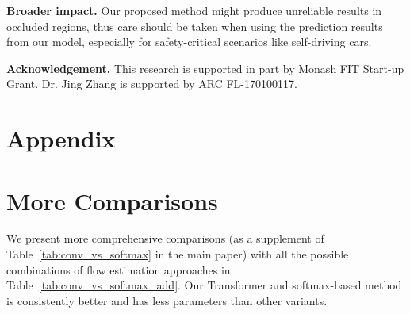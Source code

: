 \documentclass[10pt,twocolumn,letterpaper]{article}
\begin{document}
\textbf{Broader impact.} Our proposed method might produce unreliable results in occluded regions, thus care should be taken when using the prediction results from our model, especially for safety-critical scenarios like self-driving cars. 


{\bf Acknowledgement.} This research is supported in part by Monash FIT Start-up Grant. Dr. Jing Zhang is supported by ARC FL-170100117.




{\small


}



\newpage


\section*{Appendix}
\renewcommand{\thesection}{\Alph{section}}
\renewcommand{\thetable}{\Alph{table}}
\renewcommand{\thefigure}{\Alph{figure}}
\setcounter{section}{0}
\setcounter{table}{0}
\setcounter{figure}{0}




\section{More Comparisons}

We present more comprehensive comparisons (as a supplement of Table~\ref{tab:conv_vs_softmax} in the main paper) with all the possible combinations of flow estimation approaches in Table~\ref{tab:conv_vs_softmax_add}. Our Transformer and softmax-based method is consistently better and has less parameters than other variants.
\end{document}
